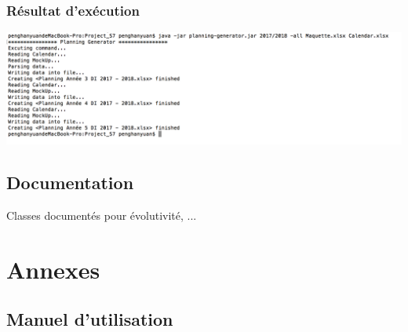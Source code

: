 \documentclass{polytech/polytech}
\begin{document}
	\subsection{Résultat d'exécution}
	\includegraphics[width=\textwidth]{./img/excution_result.png}
	\section{Documentation}

	Classes documentés pour évolutivité, ...

	\chapter{Annexes}

	\section{Manuel d'utilisation}
	
\end{document}
